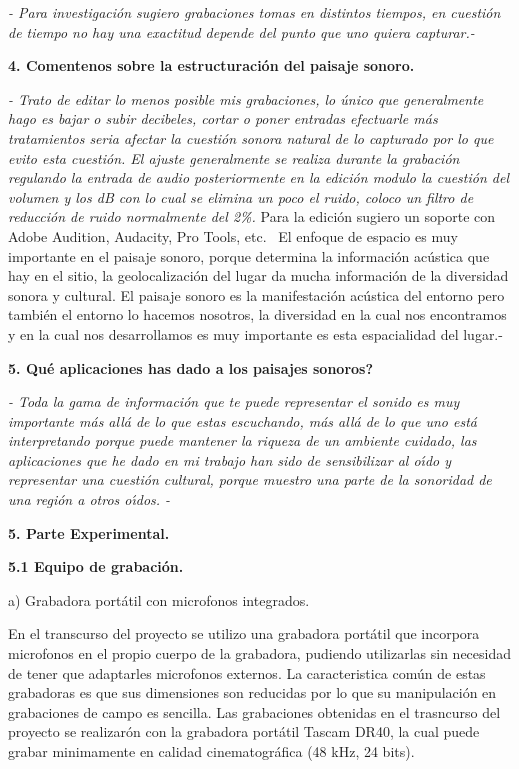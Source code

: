 \qquad\textit{- Para investigaci\'{o}n sugiero grabaciones tomas en distintos
tiempos, en cuesti\'{o}n de tiempo no hay una exactitud depende del punto que
uno quiera capturar.-}

\textbf{4. Comentenos sobre la estructuraci\'{o}n del paisaje sonoro.}

\textit{- Trato de editar lo menos posible mis grabaciones, lo \'{u}nico que
generalmente hago es bajar o subir decibeles, cortar o poner entradas
efectuarle m\'{a}s tratamientos seria afectar la cuesti\'{o}n sonora natural
de lo capturado por lo que evito esta cuesti\'{o}n. El ajuste generalmente se
realiza durante la grabaci\'{o}n regulando la entrada de audio posteriormente
en la edici\'{o}n modulo la cuesti\'{o}n del volumen y los dB con lo cual se
elimina un poco el ruido, coloco un filtro de reducci\'{o}n de ruido
normalmente del 2\%. }Para la edici\'{o}n sugiero un soporte con Adobe
Audition, Audacity, Pro Tools, etc. \ El enfoque de espacio es muy importante
en el paisaje sonoro, porque determina la informaci\'{o}n ac\'{u}stica que hay
en el sitio, la geolocalizaci\'{o}n del lugar da mucha informaci\'{o}n de la
diversidad sonora y cultural. El paisaje sonoro es la manifestaci\'{o}n
ac\'{u}stica del entorno pero tambi\'{e}n el entorno lo hacemos nosotros, la
diversidad en la cual nos encontramos y en la cual nos desarrollamos es muy
importante es esta espacialidad del lugar.-

\textbf{5. \textquestiondown Qu\'{e} aplicaciones has dado a los paisajes
sonoros?}

\textit{- Toda la gama de informaci\'{o}n que te puede representar el sonido
es muy importante m\'{a}s all\'{a} de lo que estas escuchando, m\'{a}s
all\'{a} de lo que uno est\'{a} interpretando porque puede mantener la riqueza
de un ambiente cuidado, las aplicaciones que he dado en mi trabajo han sido de
sensibilizar al o\'{\i}do y representar una cuesti\'{o}n cultural, porque
muestro una parte de la sonoridad de una regi\'{o}n a otros o\'{\i}dos. -}

\textbf{5. Parte Experimental.}

\qquad\textbf{5.1 Equipo de grabaci\'{o}n.}

a) Grabadora port\'{a}til con microfonos integrados.

En el transcurso del proyecto se utilizo una grabadora port\'{a}til que
incorpora microfonos en el propio cuerpo de la grabadora, pudiendo utilizarlas
sin necesidad de tener que adaptarles microfonos externos. La caracteristica
com\'{u}n de estas grabadoras es que sus dimensiones son reducidas por lo que
su manipulaci\'{o}n en grabaciones de campo es sencilla. Las grabaciones
obtenidas en el trasncurso del proyecto se realizar\'{o}n con la grabadora
port\'{a}til Tascam DR40, la cual puede grabar minimamente en calidad
cinematogr\'{a}fica (48 kHz, 24 bits).

